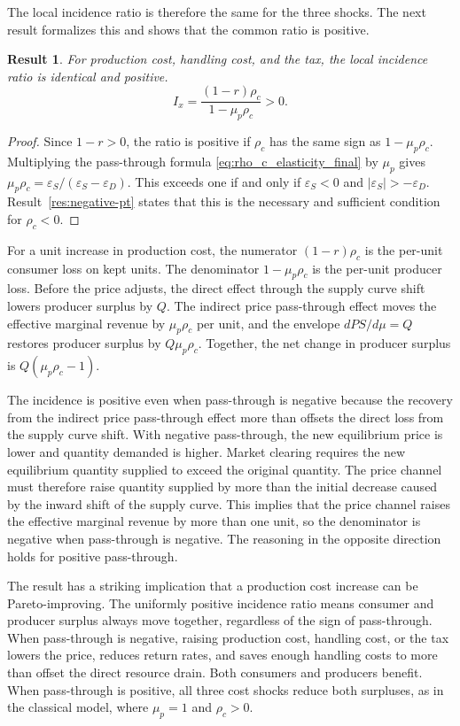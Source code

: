 \documentclass[11pt]{article}
\newtheorem{result}{Result}
\begin{document}
The local incidence ratio is therefore the same for the three shocks. The next
result formalizes this and shows that the common ratio is positive.

\begin{result}
\label{res:incidence-ratio}
For production cost, handling cost, and the tax, the local incidence
ratio is identical and positive.
\begin{equation}
  I_x = \frac{(1-r)\rho_c}{1-\mu_p \rho_c}>0.
  \label{eq:incidence_result}
\end{equation}
\end{result}
\begin{proof}
Since $1-r>0$, the ratio is positive if $\rho_c$ has the same sign as
$1-\mu_p\rho_c$. Multiplying the pass-through formula
\eqref{eq:rho_c_elasticity_final} by $\mu_p$ gives
$\mu_p\rho_c=\varepsilon_S/(\varepsilon_S-\varepsilon_D)$.
This exceeds one if and only if $\varepsilon_S<0$ and $|\varepsilon_S|>-\varepsilon_D$.
Result~\ref{res:negative-pt} states that this is the necessary and sufficient
condition for $\rho_c<0$.
\end{proof}

For a unit increase in production cost, the numerator $(1-r)\rho_c$ is the
per-unit consumer loss on kept units. The denominator $1-\mu_p\rho_c$ is
the per-unit producer loss. Before the price adjusts, the direct effect
through the supply curve shift lowers producer surplus by $Q$. The indirect price
pass-through effect moves the effective marginal revenue by $\mu_p\rho_c$ per unit,
and the envelope $dPS/d\mu=Q$ restores producer surplus by $Q\mu_p\rho_c$.
Together, the net change in producer surplus is $Q(\mu_p\rho_c-1)$.

The incidence is positive even when pass-through is negative because the
recovery from the indirect price pass-through effect more than offsets the
direct loss from the supply curve shift. With negative pass-through, the
new equilibrium price is lower and quantity demanded is higher. Market clearing requires the new equilibrium
quantity supplied to exceed the original quantity. The price channel must
therefore raise quantity supplied by more than the initial decrease caused
by the inward shift of the supply curve. This implies that the price
channel raises the effective marginal revenue by more than one unit, so the
denominator is negative when pass-through is negative. The reasoning in
the opposite direction holds for positive pass-through.

The result has a striking implication that a production cost increase can be
Pareto-improving. The uniformly positive incidence ratio means consumer and
producer surplus always move together, regardless of the sign of
pass-through. When pass-through is negative, raising production cost,
handling cost, or the tax lowers the price, reduces return rates, and saves
enough handling costs to more than offset the direct resource drain. Both
consumers and producers benefit. When pass-through is positive, all three
cost shocks reduce both surpluses, as in the classical model, where $\mu_p=1$
and $\rho_c>0$.
\end{document}
